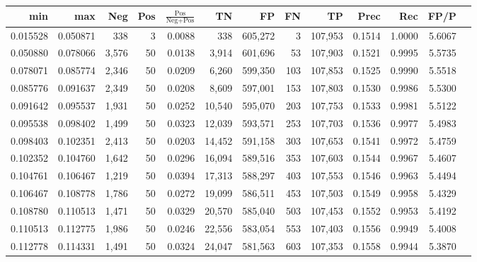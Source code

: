 \begin{tabular}{rrrrrrrrrrrrr}
\toprule
     min &      max &   Neg & Pos & $\frac{\text{Pos}}{\text{Neg}+\text{Pos}}$ &      TN &      FP &      FN &      TP &   Prec &    Rec &   FP/P \\
\midrule
0.015528 & 0.050871 &   338 &   3 &                                     0.0088 &     338 & 605,272 &       3 & 107,953 & 0.1514 & 1.0000 & 5.6067 \\
0.050880 & 0.078066 & 3,576 &  50 &                                     0.0138 &   3,914 & 601,696 &      53 & 107,903 & 0.1521 & 0.9995 & 5.5735 \\
0.078071 & 0.085774 & 2,346 &  50 &                                     0.0209 &   6,260 & 599,350 &     103 & 107,853 & 0.1525 & 0.9990 & 5.5518 \\
0.085776 & 0.091637 & 2,349 &  50 &                                     0.0208 &   8,609 & 597,001 &     153 & 107,803 & 0.1530 & 0.9986 & 5.5300 \\
0.091642 & 0.095537 & 1,931 &  50 &                                     0.0252 &  10,540 & 595,070 &     203 & 107,753 & 0.1533 & 0.9981 & 5.5122 \\
0.095538 & 0.098402 & 1,499 &  50 &                                     0.0323 &  12,039 & 593,571 &     253 & 107,703 & 0.1536 & 0.9977 & 5.4983 \\
0.098403 & 0.102351 & 2,413 &  50 &                                     0.0203 &  14,452 & 591,158 &     303 & 107,653 & 0.1541 & 0.9972 & 5.4759 \\
0.102352 & 0.104760 & 1,642 &  50 &                                     0.0296 &  16,094 & 589,516 &     353 & 107,603 & 0.1544 & 0.9967 & 5.4607 \\
0.104761 & 0.106467 & 1,219 &  50 &                                     0.0394 &  17,313 & 588,297 &     403 & 107,553 & 0.1546 & 0.9963 & 5.4494 \\
0.106467 & 0.108778 & 1,786 &  50 &                                     0.0272 &  19,099 & 586,511 &     453 & 107,503 & 0.1549 & 0.9958 & 5.4329 \\
0.108780 & 0.110513 & 1,471 &  50 &                                     0.0329 &  20,570 & 585,040 &     503 & 107,453 & 0.1552 & 0.9953 & 5.4192 \\
0.110513 & 0.112775 & 1,986 &  50 &                                     0.0246 &  22,556 & 583,054 &     553 & 107,403 & 0.1556 & 0.9949 & 5.4008 \\
0.112778 & 0.114331 & 1,491 &  50 &                                     0.0324 &  24,047 & 581,563 &     603 & 107,353 & 0.1558 & 0.9944 & 5.3870 \\

\end{tabular}
